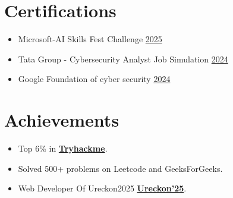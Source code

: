 \documentclass[letterpaper,11pt]{article}
\makeatletter
\newcommand{\resumeItem}[1]{
  \item\small{
    {#1 \vspace{-2pt}}
  }
}
\newcommand{\resumeSubheading}[4]{
  \vspace{-2pt}\item
    \begin{tabular*}{0.97\textwidth}[t]{l@{\extracolsep{\fill}}r}
      \textbf{#1} & #2 \\
      \textit{\small#3} & \textit{\small #4} \\
    \end{tabular*}\vspace{-7pt}
}
\newcommand{\resumeSubHeadingListStart}{\begin{itemize}[leftmargin=0.15in, label={}]}
\newcommand{\resumeSubHeadingListEnd}{\end{itemize}}
\newcommand{\resumeItemListStart}{\begin{itemize}}
\newcommand{\resumeItemListEnd}{\end{itemize}\vspace{-5pt}}
\makeatother
\begin{document}
  \section{Certifications}
  \resumeItemListStart
  \resumeItem{Microsoft-AI Skills Fest Challenge \href{https://learn.microsoft.com/en-gb/users/trishamandal-9657/achievements}{2025}}
  \resumeItem{Tata Group - Cybersecurity Analyst Job Simulation \href{https://forage-uploads-prod.s3.amazonaws.com/completion-certificates/ifobHAoMjQs9s6bKS/gmf3ypEXBj2wvfQWC_ifobHAoMjQs9s6bKS_6Nb4sGDuznzcHyCSu_1732378719946_completion_certificate.pdf}{2024}}
  \resumeItem{Google Foundation of cyber security \href{https://coursera.org/share/dc5df20e6dc55a6b8b97cd5bc2d5d927}{2024}}
  \resumeItemListEnd





\section{Achievements}
\resumeItemListStart
\resumeItem{Top 6\% in  \href{https://tryhackme.com/p/trishamandal0505}{\textbf{Tryhackme}}.}
    \resumeItem{Solved 500+ problems on Leetcode and GeeksForGeeks.}
    \resumeItem{Web Developer Of Ureckon2025 \href{https://www.linkedin.com/in/trishamandal123/overlay/1743935784621/single-media-viewer/?profileId=ACoAAD6fJSYBp1-mlWaj7Kp-LrqJQAIsUNkJcBQ}{\textbf{Ureckon'25}}.}
\resumeItemListEnd
\end{document}
